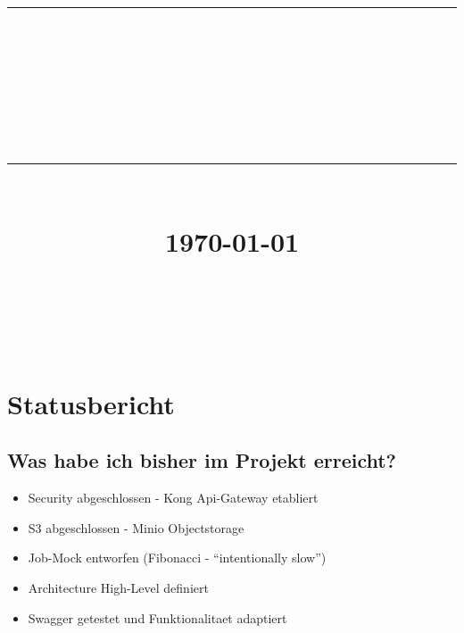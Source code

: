 \documentclass[12pt]{article}
\newcommand{\HRule}[1]{\rule{\linewidth}{#1}}
\begin{document}
\title{ \normalsize
		\HRule{0.5pt} \\
		\LARGE \textbf{\uppercase{\newCommandDiscipline}} \\
		\smallbreak
		\small\textbf{{\newCommandTerm}}\\
		\HRule{2pt} \\ [0.5cm]
		\normalsize \today \vspace*{10\baselineskip}}

\date{}

\author{
		\newCommandName \\
		\newCommandMatriculationNumber \\
		\newCommandUniversity \\
		\newCommandFaculty
}


\maketitle

\newpage



\sectionfont{\scshape}


\section{Statusbericht}
\subsection{Was habe ich bisher im Projekt erreicht?}
\begin{itemize}
\item Security abgeschlossen - Kong Api-Gateway etabliert
\item S3 abgeschlossen - Minio Objectstorage
\item Job-Mock entworfen (Fibonacci - ``intentionally slow'')
\item Architecture High-Level definiert
\item Swagger getestet und Funktionalitaet adaptiert
\end{itemize}
\smallbreak
\end{document}

